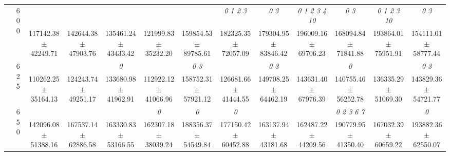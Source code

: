 \begin{table}[h]
{\begin{tabular}{
        ccccccccccccc}
 & \multirow{2}{*}{600}& & & & & & \textit{ 0 1 2 3 }& \textit{ 0 3 }& \textit{  0  1  2  3  4 10 }& \textit{ 0 3 }& \textit{  0  1  2  3 10 }& \textit{ 0 3 } \\ 
 & & 117142.38 $\pm$ 42249.71& 142644.38 $\pm$ 47903.76& 135461.24 $\pm$ 43433.42& 121999.83 $\pm$ 35232.20& 159854.53 $\pm$ 89785.61& 182325.35 $\pm$ 72057.09& 179304.95 $\pm$ 83846.42& 196009.16 $\pm$ 69706.23& 168094.84 $\pm$ 71841.88& 193864.01 $\pm$ 75951.91& 154111.01 $\pm$ 58777.44 \\ 
 & \multirow{2}{*}{625}& \cellcolor[HTML]{EFEFEF} & \cellcolor[HTML]{EFEFEF} & \cellcolor[HTML]{EFEFEF} \textit{ 0 }& \cellcolor[HTML]{EFEFEF} & \cellcolor[HTML]{EFEFEF} \textit{ 0 3 }& \cellcolor[HTML]{EFEFEF} & \cellcolor[HTML]{EFEFEF} \textit{ 0 3 }& \cellcolor[HTML]{EFEFEF} & \cellcolor[HTML]{EFEFEF} \textit{ 0 }& \cellcolor[HTML]{EFEFEF} & \cellcolor[HTML]{EFEFEF} \textit{ 0 3 } \\ 
 & & \cellcolor[HTML]{EFEFEF} 110262.25 $\pm$ 35164.13& \cellcolor[HTML]{EFEFEF} 124243.74 $\pm$ 49251.17& \cellcolor[HTML]{EFEFEF} 133680.98 $\pm$ 41962.91& \cellcolor[HTML]{EFEFEF} 112922.12 $\pm$ 41066.96& \cellcolor[HTML]{EFEFEF} 158752.31 $\pm$ 57921.12& \cellcolor[HTML]{EFEFEF} 126681.66 $\pm$ 41444.55& \cellcolor[HTML]{EFEFEF} 149708.25 $\pm$ 64462.19& \cellcolor[HTML]{EFEFEF} 143631.40 $\pm$ 67976.39& \cellcolor[HTML]{EFEFEF} 140755.46 $\pm$ 56252.78& \cellcolor[HTML]{EFEFEF} 136335.29 $\pm$ 51069.30& \cellcolor[HTML]{EFEFEF} 143829.36 $\pm$ 54721.77 \\ 
 & \multirow{2}{*}{650}& & & & \textit{ 0 }& \textit{ 0 }& \textit{ 0 }& & & \textit{ 0 2 3 6 7 }& & \textit{ 0 } \\ 
 & & 142096.08 $\pm$ 51388.16& 167537.14 $\pm$ 62886.58& 163330.83 $\pm$ 53166.55& 162307.18 $\pm$ 38039.24& 188356.37 $\pm$ 54549.84& 177150.42 $\pm$ 60452.88& 163137.94 $\pm$ 43181.68& 162487.22 $\pm$ 44209.56& 190779.95 $\pm$ 41350.40& 167032.39 $\pm$ 60659.22& 193882.36 $\pm$ 62550.07 \\ \midrule 

        \bottomrule
        \end{tabular}%
        }

        \end{table}
        
